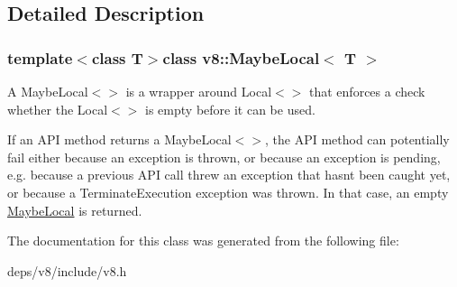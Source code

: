 \subsection{Detailed Description}
\subsubsection*{template$<$class T$>$class v8\+::\+Maybe\+Local$<$ T $>$}

A Maybe\+Local$<$$>$ is a wrapper around Local$<$$>$ that enforces a check whether the Local$<$$>$ is empty before it can be used.

If an A\+P\+I method returns a Maybe\+Local$<$$>$, the A\+P\+I method can potentially fail either because an exception is thrown, or because an exception is pending, e.\+g. because a previous A\+P\+I call threw an exception that hasn\textquotesingle{}t been caught yet, or because a Terminate\+Execution exception was thrown. In that case, an empty \hyperlink{classv8_1_1_maybe_local}{Maybe\+Local} is returned. 

The documentation for this class was generated from the following file\+:\begin{DoxyCompactItemize}
\item 
deps/v8/include/v8.\+h\end{DoxyCompactItemize}
